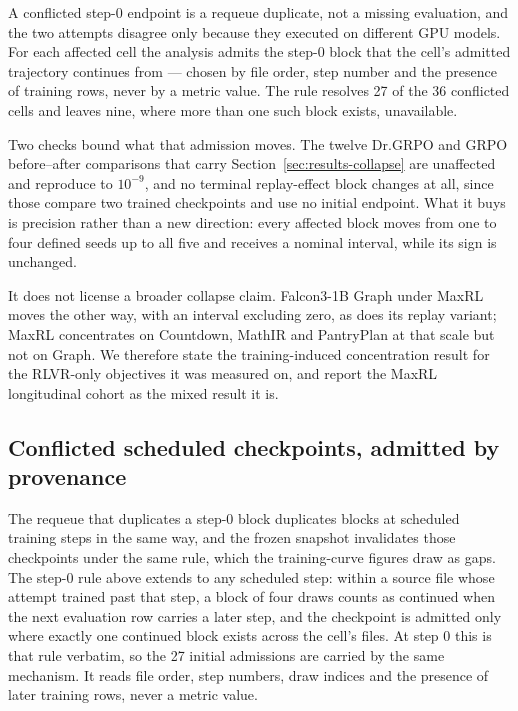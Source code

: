 \documentclass{article}
\newcommand{\1}{\mathbf 1}
\theoremstyle{remark}
\theoremstyle{definition}
\theoremstyle{plain}
\begin{document}
A conflicted step-0 endpoint is a requeue duplicate, not a missing evaluation,
and the two attempts disagree only because they executed on different GPU
models. For each affected cell the analysis admits the step-0 block that the
cell's admitted trajectory continues from --- chosen by file order, step number
and the presence of training rows, never by a metric value. The rule resolves
27 of the 36 conflicted cells and leaves nine, where more than one such block
exists, unavailable.

Two checks bound what that admission moves. The twelve Dr.GRPO and GRPO
before--after comparisons that carry Section~\ref{sec:results-collapse} are
unaffected and reproduce to $10^{-9}$, and no terminal replay-effect block
changes at all, since those compare two trained checkpoints and use no initial
endpoint. What it buys is precision rather than a new direction: every affected
block moves from one to four defined seeds up to all five and
receives a nominal interval, while its sign is unchanged.

It does not license a broader collapse claim. Falcon3-1B Graph under MaxRL
moves the other way, with an interval excluding zero, as does its replay
variant; MaxRL concentrates on Countdown, MathIR and PantryPlan at that scale
but not on Graph. We therefore state the training-induced concentration result
for the RLVR-only objectives it was measured on, and report the MaxRL
longitudinal cohort as the mixed result it is.

\subsection{Conflicted scheduled checkpoints, admitted by provenance}
\label{app:scheduled-provenance}

The requeue that duplicates a step-0 block duplicates blocks at scheduled
training steps in the same way, and the frozen snapshot invalidates those
checkpoints under the same rule, which the training-curve figures draw as gaps.
The step-0 rule above extends to any scheduled step: within a source file
whose attempt trained past that step, a block of four draws counts as continued
when the next evaluation row carries a later step, and the checkpoint is
admitted only where exactly one continued block exists across the cell's files.
At step 0 this is that rule verbatim, so the 27 initial admissions are carried
by the same mechanism. It reads file order, step numbers, draw indices and the
presence of later training rows, never a metric value.
\end{document}
